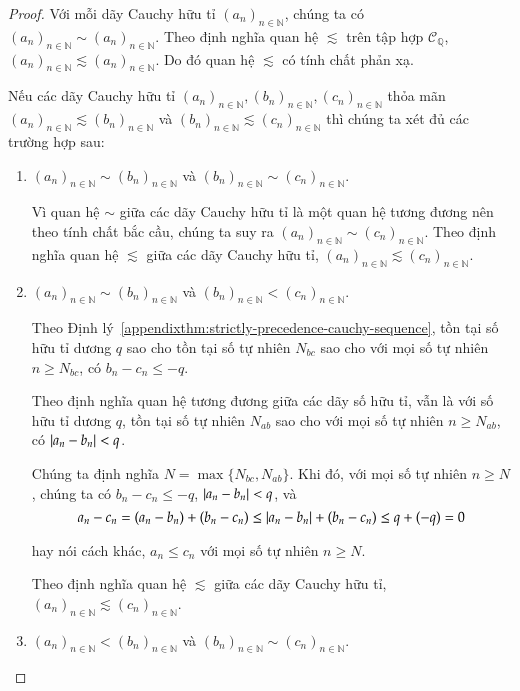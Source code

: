 \begin{proof}
    Với mỗi dãy Cauchy hữu tỉ ${(a_{n})}_{n\in\mathbb{N}}$, chúng ta có ${(a_{n})}_{n\in\mathbb{N}} \sim {(a_{n})}_{n\in\mathbb{N}}$. Theo định nghĩa quan hệ $\lesssim$ trên tập hợp $\mathscr{C}_{\mathbb{Q}}$, ${(a_{n})}_{n\in\mathbb{N}} \lesssim {(a_{n})}_{n\in\mathbb{N}}$. Do đó quan hệ $\lesssim$ có tính chất phản xạ.

    Nếu các dãy Cauchy hữu tỉ ${(a_{n})}_{n\in\mathbb{N}}, {(b_{n})}_{n\in\mathbb{N}}, {(c_{n})}_{n\in\mathbb{N}}$ thỏa mãn ${(a_{n})}_{n\in\mathbb{N}}\lesssim {(b_{n})}_{n\in\mathbb{N}}$ và ${(b_{n})}_{n\in\mathbb{N}}\lesssim {(c_{n})}_{n\in\mathbb{N}}$ thì chúng ta xét đủ các trường hợp sau:
    \begin{enumerate}[label={\textbf{Trường hợp \arabic*.}},itemindent=2cm]
        \item ${(a_{n})}_{n\in\mathbb{N}}\sim {(b_{n})}_{n\in\mathbb{N}}$ và ${(b_{n})}_{n\in\mathbb{N}}\sim {(c_{n})}_{n\in\mathbb{N}}$.

              Vì quan hệ $\sim$ giữa các dãy Cauchy hữu tỉ là một quan hệ tương đương nên theo tính chất bắc cầu, chúng ta suy ra ${(a_{n})}_{n\in\mathbb{N}}\sim {(c_{n})}_{n\in\mathbb{N}}$. Theo định nghĩa quan hệ $\lesssim$ giữa các dãy Cauchy hữu tỉ, ${(a_{n})}_{n\in\mathbb{N}}\lesssim {(c_{n})}_{n\in\mathbb{N}}$.
        \item ${(a_{n})}_{n\in\mathbb{N}}\sim {(b_{n})}_{n\in\mathbb{N}}$ và ${(b_{n})}_{n\in\mathbb{N}} < {(c_{n})}_{n\in\mathbb{N}}$.

              Theo Định lý~\ref{appendixthm:strictly-precedence-cauchy-sequence}, tồn tại số hữu tỉ dương $q$ sao cho tồn tại số tự nhiên $N_{bc}$ sao cho với mọi số tự nhiên $n\geq N_{bc}$, có $b_{n} - c_{n}\leq -q$.

              Theo định nghĩa quan hệ tương đương giữa các dãy số hữu tỉ, vẫn là với số hữu tỉ dương $q$, tồn tại số tự nhiên $N_{ab}$ sao cho với mọi số tự nhiên $n\geq N_{ab}$, có $\left\vert{a_{n} - b_{n}}\right\vert < q$.

              Chúng ta định nghĩa $N = \max\{ N_{bc}, N_{ab} \}$. Khi đó, với mọi số tự nhiên $n\geq N$, chúng ta có $b_{n} - c_{n}\leq -q$, $\left\vert{a_{n} - b_{n}}\right\vert < q$, và
              \[
                  a_{n} - c_{n} = (a_{n} - b_{n}) + (b_{n} - c_{n})\leq \left\vert{a_{n} - b_{n}}\right\vert + (b_{n} - c_{n})\leq q + (-q) = 0
              \]

              hay nói cách khác, $a_{n}\leq c_{n}$ với mọi số tự nhiên $n\geq N$.

              Theo định nghĩa quan hệ $\lesssim$ giữa các dãy Cauchy hữu tỉ, ${(a_{n})}_{n\in\mathbb{N}}\lesssim {(c_{n})}_{n\in\mathbb{N}}$.
        \item ${(a_{n})}_{n\in\mathbb{N}} < {(b_{n})}_{n\in\mathbb{N}}$ và ${(b_{n})}_{n\in\mathbb{N}}\sim {(c_{n})}_{n\in\mathbb{N}}$.


\end{enumerate}
\end{proof}
